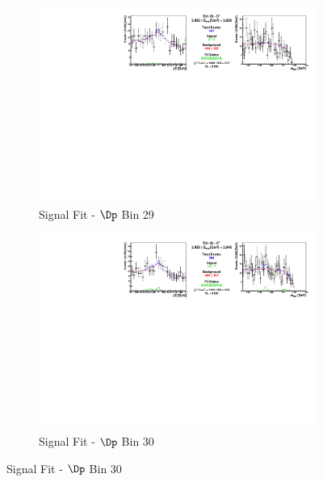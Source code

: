 \begin{figure}[h]

\begin{subfigure}[c]{0.99\textwidth}
\includegraphics[width=\textwidth]{figures/plots/fit_results/Dp_bin_29.pdf}
\caption*{Signal Fit - $\Dp$ Bin 29}
\end{subfigure}

\vspace{5pt}

\begin{subfigure}[c]{0.99\textwidth}
\includegraphics[width=\textwidth]{figures/plots/fit_results/Dp_bin_30.pdf}
\caption*{Signal Fit - $\Dp$ Bin 30}
\end{subfigure}

\vspace{5pt}


\end{figure}
